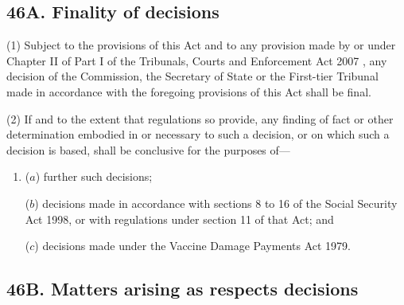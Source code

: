 \documentclass[12pt,a4paper]{article}
\begin{document}

\subsection{46A. Finality of decisions}

(1) Subject to the provisions of this Act
and to any provision made by or under Chapter II of Part I of the Tribunals, Courts and Enforcement Act 2007%
, any decision of 
the Commission,  %
the Secretary of State or 
the First-tier Tribunal  %
made in accordance with the foregoing provisions of this Act shall be final.

(2) If and to the extent that regulations so provide, any finding of fact or other determination embodied in or necessary to such a decision, or on which such a decision is based, shall be conclusive for the purposes of—
\begin{enumerate}\item[]
($a$) further such decisions;

($b$) decisions made in accordance with sections 8 to 16 of the Social Security Act 1998, or with regulations under section 11 of that Act; and

($c$) decisions made under the Vaccine Damage Payments Act 1979.
\end{enumerate}


\subsection{46B. Matters arising as respects decisions}
\end{document}
